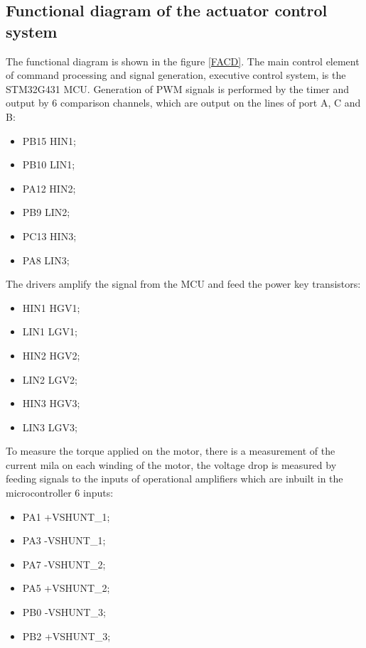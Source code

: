 \subsection{Functional diagram of the actuator control system}
The functional diagram is shown in the figure \ref{FACD}. The main control element of command processing and signal generation, executive control system, is the STM32G431 MCU. Generation of PWM signals is performed by the timer and output by 6 comparison channels, which are output on the lines of port A, C and B:

\begin{itemize}
	\item PB15 \rightarrow HIN1;
	\item PB10 \rightarrow LIN1;
	\item PA12 \rightarrow HIN2;
	\item PB9 \rightarrow LIN2;
	\item PC13 \rightarrow HIN3;
	\item PA8 \rightarrow LIN3;
\end{itemize}
The drivers amplify the signal from the MCU and feed the power key transistors:
\begin{itemize}
	\item HIN1 \rightarrow HGV1;
	\item LIN1 \rightarrow LGV1;
	\item HIN2 \rightarrow HGV2;
	\item LIN2 \rightarrow LGV2;
	\item HIN3 \rightarrow HGV3;
	\item LIN3 \rightarrow LGV3;
\end{itemize}


To measure the torque applied on the motor, there is a measurement of the current mila on each winding of the motor, the voltage drop is measured by feeding signals to the inputs of operational amplifiers which are inbuilt in the microcontroller 6 inputs:

\begin{itemize}
	\item PA1 \leftarrow +VSHUNT\_1;
	\item PA3 \leftarrow -VSHUNT\_1;
	\item PA7 \leftarrow -VSHUNT\_2;
	\item PA5 \leftarrow +VSHUNT\_2;  %
	\item PB0 \leftarrow -VSHUNT\_3;
	\item PB2 \leftarrow +VSHUNT\_3;  %
\end{itemize}

